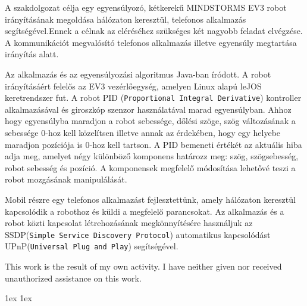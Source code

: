 \documentclass[final]{ubb_dolgozat}
\author{
Márton Zete-Örs
}
\begin{document}
\begin{abstractEN}
	
A szakdolgozat célja egy egyensúlyozó, kétkerekű MINDSTORMS EV3 robot irányításának megoldása hálózaton keresztül, telefonos alkalmazás segítségével.Ennek a célnak az eléréséhez szükséges két nagyobb feladat elvégzése. A kommunikációt megvalósító telefonos alkalmazás illetve egyensúly megtartása irányítás alatt.

Az alkalmazás és az egyensúlyozási algoritmus Java-ban íródott. A robot irányításáért felelős az EV3 vezérlőegység, amelyen Linux alapú leJOS keretrendszer fut. A robot PID (\texttt{Proportional Integral Derivative}) kontroller alkalmazásával és giroszkóp szenzor használatával marad egyensúlyban. Ahhoz hogy egyensúlyba maradjon a robot sebessége, dőlési szöge, szög változásának a sebessége 0-hoz kell közelítsen illetve annak az érdekében, hogy egy helyebe maradjon pozíciója is 0-hoz kell tartson.
A PID bemeneti értékét az aktuális hiba adja meg, amelyet négy különböző komponens határozz meg: szög, szögsebesség, robot sebesség és pozíció. A komponensek megfelelő módosítása lehetővé teszi a robot mozgásának manipulálását. 

Mobil részre egy telefonos alkalmazást fejlesztettünk, amely hálózaton keresztül kapcsolódik a robothoz és küldi a megfelelő parancsokat. Az alkalmazás és a robot közti kapcsolat létrehozásának megkönnyítésére használjuk az SSDP(\texttt{Simple Service Discovery Protocol}) automatikus kapcsolódást UPnP(\texttt{Universal Plug and Play}) segítségével. 

This work is the result of my own activity. I have neither given nor received unauthorized assistance on this work.

\end{abstractEN}

\maketitle

{ \baselineskip 1ex
  \parskip 1ex
  \tableofcontents
}





%
%
%
\appendix

{ 
	\renewcommand{\baselinestretch}{1.1}\normalsize %
	\setlength{\itemsep}{-2.4mm}
	\setlength{\bibspacing}{0.67\baselineskip}
	
	
}
\end{document}
